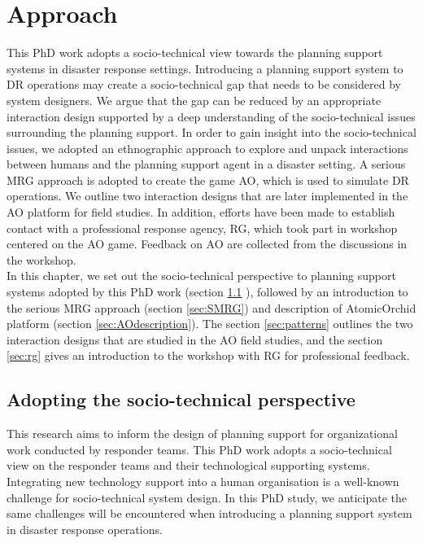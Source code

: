 \chapter{Approach}\label{ch:approach}
This PhD work adopts a socio-technical view towards the planning support systems in disaster response settings. Introducing a planning support system to \acf{DR} operations may create a socio-technical gap that needs to be considered by system designers. We argue that the gap can be reduced by an appropriate interaction design supported by a deep understanding of the socio-technical issues surrounding the planning support. In order to gain insight into the socio-technical issues, we adopted an ethnographic approach to explore and unpack interactions between humans and the planning support agent in a disaster setting. A serious \acf{MRG} approach is adopted to create the game \acf{AO}, which is used to simulate \ac{DR} operations. We outline two interaction designs that are later implemented in the \ac{AO} platform for field studies. In addition, efforts have been made to establish contact with a professional response agency, \acf{RG}, which took part in workshop centered on the \ac{AO} game. Feedback on \ac{AO} are collected from the discussions in the workshop. \\

In this chapter, we set out the socio-technical perspective to planning support systems adopted by this PhD work (section \ref{sec:sociotech} ), followed by an introduction to the serious \acf{MRG} approach (section \ref{sec:SMRG}) and description of AtomicOrchid platform (section \ref{sec:AOdescription}). The section \ref{sec:patterns} outlines the two interaction designs that are studied in the \ac{AO} field studies, and the section \ref{sec:rg} gives an introduction to the workshop with \ac{RG} for professional feedback. \\


\section{Adopting the socio-technical perspective}\label{sec:sociotech}
This research aims to inform the design of planning support for organizational work conducted by responder teams. This PhD work adopts a socio-technical view on the responder teams and their technological supporting systems. Integrating new technology support into a human organisation is a well-known challenge for socio-technical system design. In this PhD study, we anticipate the same challenges will be encountered when introducing a planning support system in disaster response operations.\\

